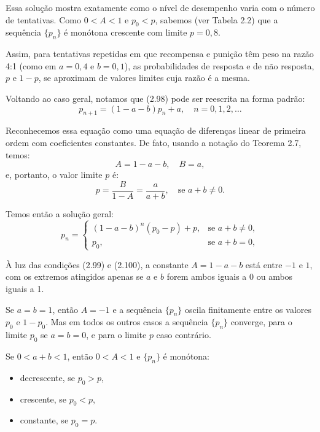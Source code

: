 \documentclass{article}
\begin{document}
Essa solução mostra exatamente como o nível de desempenho varia com o número de tentativas. Como $0 < A < 1$ e $p_0 < p$, sabemos (ver Tabela 2.2) que a sequência $\{p_n\}$ é monótona crescente com limite $p = 0{,}8$.

Assim, para tentativas repetidas em que recompensa e punição têm peso na razão 4:1 (como em $a = 0{,}4$ e $b = 0{,}1$), as probabilidades de resposta e de não resposta, $p$ e $1 - p$, se aproximam de valores limites cuja razão é a mesma.

Voltando ao caso geral, notamos que (2.98) pode ser reescrita na forma padrão:
\begin{equation}
p_{n+1} = (1 - a - b)p_n + a, \quad n = 0, 1, 2, \ldots
\tag{2.103}
\end{equation}

Reconhecemos essa equação como uma equação de diferenças linear de primeira ordem com coeficientes constantes. De fato, usando a notação do Teorema 2.7, temos:
\[
A = 1 - a - b, \quad B = a,
\]
e, portanto, o valor limite $p$ é:
\begin{equation}
p = \frac{B}{1 - A} = \frac{a}{a + b}, \quad \text{se } a + b \neq 0.
\tag{2.104}
\end{equation}

Temos então a solução geral:
\begin{equation}
p_n = 
\begin{cases}
(1 - a - b)^n(p_0 - p) + p, & \text{se } a + b \neq 0, \\
p_0, & \text{se } a + b = 0,
\end{cases}
\tag{2.105}
\end{equation}

À luz das condições (2.99) e (2.100), a constante $A = 1 - a - b$ está entre $-1$ e $1$, com os extremos atingidos apenas se $a$ e $b$ forem ambos iguais a 0 ou ambos iguais a 1.

Se $a = b = 1$, então $A = -1$ e a sequência $\{p_n\}$ oscila finitamente entre os valores $p_0$ e $1 - p_0$. Mas em todos os outros casos a sequência $\{p_n\}$ converge, para o limite $p_0$ se $a = b = 0$, e para o limite $p$ caso contrário.

Se $0 < a + b < 1$, então $0 < A < 1$ e $\{p_n\}$ é monótona:
\begin{itemize}
  \item decrescente, se $p_0 > p$,
  \item crescente, se $p_0 < p$,
  \item constante, se $p_0 = p$.
\end{itemize}
\end{document}
